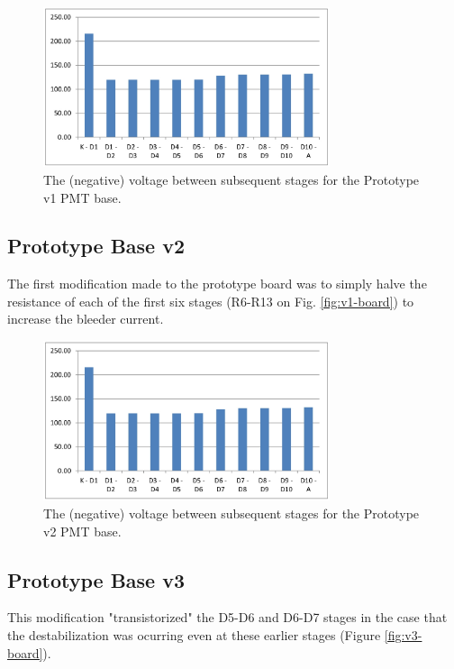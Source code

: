 \documentclass[11pt]{article}
\begin{document}
\begin{figure}[h]
    \centerline{
    \mbox{\includegraphics[width=0.75\textwidth]{v2-volt.jpg}}
    }
    \caption{The (negative) voltage between subsequent stages for the Prototype v1 PMT base.}
    \label{fig:v1-volt}
\end{figure}
\newpage

\subsection{Prototype Base v2}

The first modification made to the prototype board was to simply halve the resistance of each of the first six stages (R6-R13 on Fig. \ref{fig:v1-board}) to increase the bleeder current.

\begin{figure}[h]
    \centerline{
    \mbox{\includegraphics[width=0.75\textwidth]{v2-volt.jpg}}
    }
    \caption{The (negative) voltage between subsequent stages for the Prototype v2 PMT base.}
    \label{fig:v2-volt}
\end{figure}
\newpage

\subsection{Prototype Base v3}

This modification "transistorized" the D5-D6 and D6-D7 stages in the case that the destabilization was ocurring even at these earlier stages (Figure \ref{fig:v3-board}).
\end{document}
